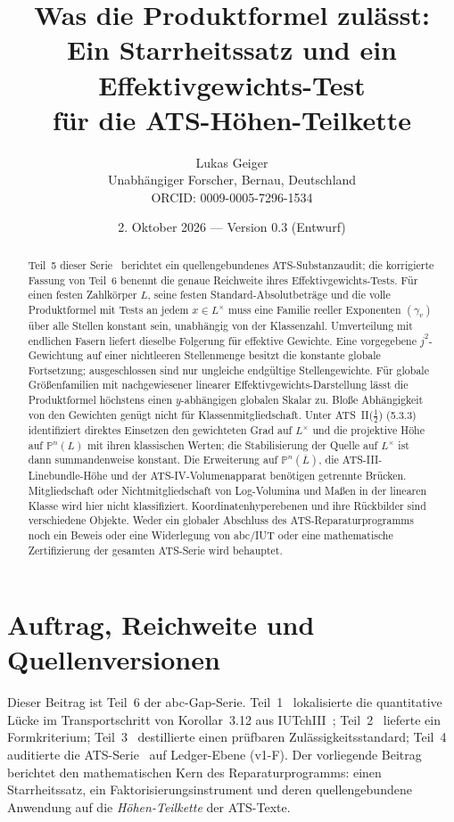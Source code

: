 \documentclass[11pt,a4paper]{article}
\title{Was die Produktformel zulässt:\\Ein Starrheitssatz und ein Effektivgewichts-Test\\für die ATS-Höhen-Teilkette}
\author{Lukas Geiger\\\small Unabhängiger Forscher, Bernau, Deutschland\\\small ORCID: 0009-0005-7296-1534}
\date{2. Oktober 2026 --- Version 0.3 (Entwurf)}
\theoremstyle{definition}
\theoremstyle{remark}
\begin{document}
\maketitle

\begin{abstract}
Teil~5 dieser Serie~\cite{part5} berichtet ein quellengebundenes ATS-Substanzaudit;
die korrigierte Fassung von Teil~6 benennt die genaue Reichweite ihres
Effektivgewichts-Tests. Für einen festen Zahlkörper $L$, seine festen
Standard-Absolutbeträge und die volle Produktformel mit Tests an jedem
$x\in L^\times$ muss eine Familie reeller Exponenten $(\gamma_v)$ über alle
Stellen konstant sein, unabhängig von der Klassenzahl. Umverteilung mit
endlichen Fasern liefert dieselbe Folgerung für effektive Gewichte. Eine
vorgegebene $j^2$-Gewichtung auf einer nichtleeren Stellenmenge besitzt die
konstante globale Fortsetzung; ausgeschlossen sind nur ungleiche endgültige
Stellengewichte. Für globale Größenfamilien mit nachgewiesener linearer
Effektivgewichts-Darstellung lässt die Produktformel höchstens einen
$y$-abhängigen globalen Skalar zu. Bloße Abhängigkeit von den Gewichten genügt
nicht für Klassenmitgliedschaft. Unter ATS~II($\tfrac12$) (5.3.3) identifiziert
direktes Einsetzen den gewichteten Grad auf $L^\times$ und die projektive Höhe
auf $\mathbb P^n(L)$ mit ihren klassischen Werten; die Stabilisierung der
Quelle auf $L^\times$ ist dann summandenweise konstant. Die Erweiterung auf
$\mathbb P^n(\overline L)$, die ATS-III-Linebundle-Höhe und der
ATS-IV-Volumenapparat benötigen getrennte Brücken. Mitgliedschaft oder
Nichtmitgliedschaft von Log-Volumina und Maßen in der linearen Klasse wird
hier nicht klassifiziert. Koordinatenhyperebenen und ihre Rückbilder sind
verschiedene Objekte. Weder ein globaler Abschluss des ATS-Reparaturprogramms
noch ein Beweis oder eine Widerlegung von abc/IUT oder eine mathematische
Zertifizierung der gesamten ATS-Serie wird behauptet.
\end{abstract}

\clearpage
\tableofcontents
\clearpage

\section{Auftrag, Reichweite und Quellenversionen}\label{sec:mandate}

Dieser Beitrag ist Teil~6 der abc-Gap-Serie. Teil~1~\cite{part1} lokalisierte
die quantitative Lücke im Transportschritt von Korollar~3.12 aus IUTchIII~\cite{mochizukiIUT}; Teil~2~\cite{part2} lieferte ein Formkriterium; Teil~3~\cite{part3} destillierte einen prüfbaren
Zulässigkeitsstandard; Teil~4~\cite{part4} auditierte die ATS-Serie~\cite{joshiI,joshiII,joshiIIhalf,joshiIII,joshiIV} auf Ledger-Ebene (v1-F). Der
vorliegende Beitrag berichtet den mathematischen Kern des Reparaturprogramms:
einen Starrheitssatz, ein Faktorisierungsinstrument und deren
quellengebundene Anwendung auf die \emph{Höhen-Teilkette} der ATS-Texte.
\end{document}
